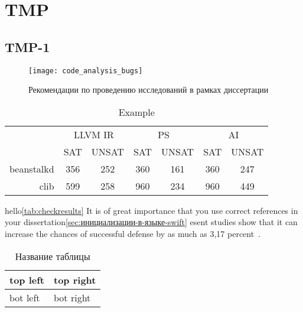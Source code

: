 \chapter{TMP}


\section{TMP-1}

\begin{figure}[htbp]
    \centering
    \texttt{[image: code\_analysis\_bugs]}
    \caption{Рекомендации по проведению исследований в рамках диссертации}%
    \label{fig:how-to-do-research}
\end{figure}

\begin{table}
    \captionsetup{skip=5pt}
    \caption{Example}
    \centering
    \begin{tabular}{|r|c|c|c|c|c|c|}
        \hline
        \multirow{2}{*}{}
        & \multicolumn{2}{c|}{LLVM IR}
        & \multicolumn{2}{c|}{PS}
        & \multicolumn{2}{c|}{AI} \\ \cline{2-7}
        & SAT    & UNSAT   & SAT    & UNSAT   & SAT    & UNSAT   \\ \hline
        beanstalkd & 356    & 252     & 360    & 161     & 360    & 247     \\ \hline
        clib       & 599    & 258     & 960    & 234     & 960    & 449     \\ \hline
    \end{tabular}
    \label{tab:checkresults}
\end{table}



\blindtext

hello\autoref{tab:checkresults} It is of great importance that you use correct references in your
dissertation\ref{sec:инициализации-в-языке-swift} esent studies show that it can increase the chances of successful defense
by as much as 3,17 percent~\cite{russian, ANTLR, java-book}.

\begin{table}[H]
    \caption{Название таблицы}
    \begin{center}
        \begin{tabular}{|l|l|}
            \hline
            top left & top right\\ \hline
            bot left & bot right\\ \hline
        \end{tabular}
        \label{tabular:tab_examp}
    \end{center}
\end{table}


